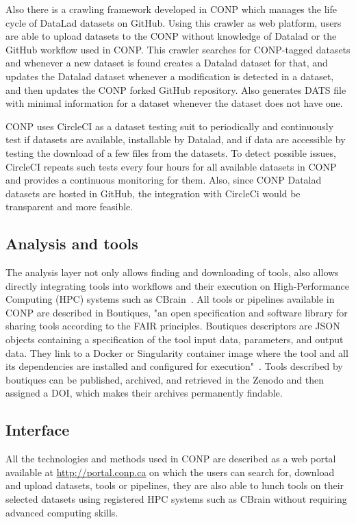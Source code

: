 Also there is a crawling framework developed in CONP which manages the life cycle of DataLad datasets on GitHub. Using this crawler as web platform, users are able to upload datasets to the CONP without knowledge of Datalad or the GitHub workflow used in CONP. This crawler searches for CONP-tagged datasets and whenever a new dataset is found creates a Datalad dataset for that, and updates the Datalad dataset whenever a modification is detected in a dataset, and then updates the CONP forked GitHub repository. Also generates DATS file with minimal information for a dataset whenever the dataset does not have one.

CONP uses CircleCI as a dataset testing suit to periodically and continuously test if datasets are available, installable by Datalad, and if data are accessible by testing the download of a few files from the datasets. To detect possible issues, CircleCI repeats such tests every four hours for all available datasets in CONP and provides a continuous monitoring for them. Also, since CONP Datalad datasets are hosted in GitHub, the integration with CircleCi would be transparent and more feasible.

\subsection{Analysis and tools}
The analysis layer not only allows finding and downloading of tools, also allows directly integrating tools into workflows and their execution on High-Performance Computing (HPC) systems such as CBrain~\cite{}. All tools or pipelines available in CONP are described in Boutiques, "an open specification and software library for sharing tools according to the FAIR principles. Boutiques descriptors are JSON objects containing a specification of the tool input data, parameters, and output data. They link to a Docker or Singularity container image where the tool and all its dependencies are installed and configured for execution"~\cite{conppaper}. Tools described by boutiques  can be published, archived, and retrieved in the Zenodo and then assigned a DOI, which makes their archives permanently findable.

\subsection{Interface}
All the technologies and methods used in CONP are described as a web portal available at \url{http://portal.conp.ca} on which the users can search for, download and upload datasets, tools or pipelines, they are also able to lunch tools on their selected datasets using registered HPC systems such as CBrain without requiring advanced computing skills.  


